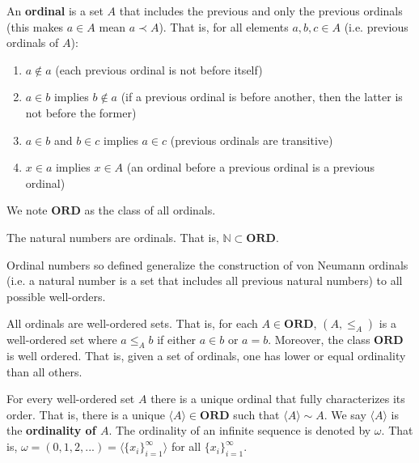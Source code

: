 \documentclass{bareminimum}
\def\ordinals{\textbf{ORD}}
\def\ordless{\prec}
\def\ordeq{\sim}
\begin{document}
\begin{defn}[Ordinals]
	An \textbf{ordinal} \marginleft{Ordinals: \ordinals} is a set $A$ that includes the previous and only the previous ordinals (this makes $a \in A$ mean $a \ordless A$). That is, for all elements $a, b, c \in A$ (i.e. previous ordinals of $A$):
	\begin{enumerate}
		\item $a \notin a$ (each previous ordinal is not before itself)
		\item $a \in b$ implies $b \notin a$ (if a previous ordinal is before another, then the latter is not before the former)
		\item $a \in b$ and $b \in c$ implies $a \in c$ (previous ordinals are transitive)
		\item $x \in a$ implies $x \in A$ (an ordinal before a previous ordinal is a previous ordinal)
	\end{enumerate}
	We note $\ordinals$ as the class of all ordinals.
\end{defn}

\begin{prop}
	The natural numbers are ordinals. That is, $\mathbb{N} \subset \ordinals$.
\end{prop}

\begin{remark}
	Ordinal numbers so defined generalize the construction of von Neumann ordinals (i.e. a natural number is a set that includes all previous natural numbers) to all possible well-orders.
\end{remark}

\begin{prop}
	All ordinals are well-ordered sets. That is, for each $A \in \ordinals$, $(A, \leq_A)$ is a well-ordered set where $a \leq_A b$ if either $a \in b$ or $a = b$. Moreover, the class $\ordinals$ is well ordered. That is, given a set of ordinals, one has lower or equal ordinality than all others.
\end{prop}

\begin{prop}
	For every  well-ordered set $A$ there is a unique ordinal that fully characterizes its order. That is, there is a unique $\langle A \rangle \in \ordinals$ such that $\langle A \rangle \ordeq A$. We say $\langle A \rangle$ is the \textbf{ordinality of $A$}. The ordinality of an infinite sequence is denoted by $\omega$. That is, $\omega = (0, 1, 2, ...) = \langle \{x_i\}_{i=1}^\infty \rangle$ for all $\{x_i\}_{i=1}^\infty$.
\end{prop}
\end{document}
